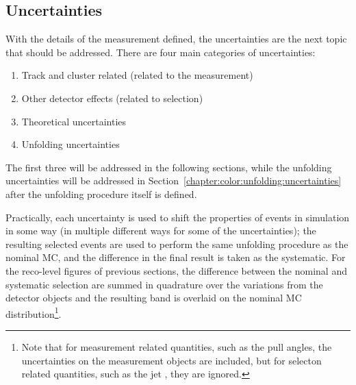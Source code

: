 


\subsection{Uncertainties}

With the details of the measurement defined, the uncertainties are the next topic that should be addressed. There are four main categories of uncertainties:
%
\begin{enumerate}
\item Track and cluster related (related to the measurement)
\item Other detector effects (related to selection)
\item Theoretical uncertainties
\item Unfolding uncertainties
\end{enumerate}
%
The first three will be addressed in the following sections, while the unfolding uncertainties will be addressed in Section~\ref{chapter:color:unfolding:uncertainties} after the unfolding procedure itself is defined.

 Practically, each uncertainty is used to shift the properties of events in simulation in some way (in multiple different ways for some of the uncertainties); the resulting selected events are used to perform the same unfolding procedure as the nominal MC, and the difference in the final result is taken as the systematic. For the reco-level figures of previous sections, the difference between the nominal and systematic selection are summed in quadrature over the variations from the detector objects and the resulting band is overlaid on the nominal MC distribution\footnote{Note that for measurement related quantities, such as the pull angles, the uncertainties on the measurement objects are included, but for selecton related quantities, such as the jet \pt, they are ignored.}.

